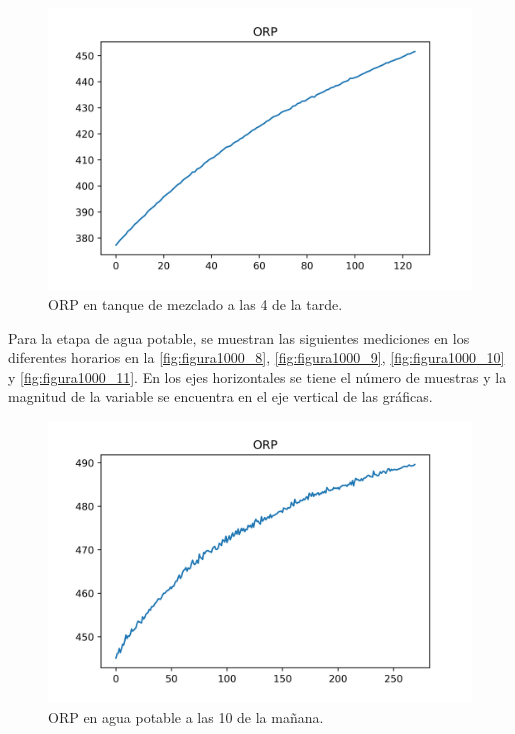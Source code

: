 \begin{figure}[h]
	\centering
	\includegraphics[scale=0.7]{imgss160.png}
	\caption{ORP en tanque de mezclado a las 4 de la tarde.}
	\label{fig:figura1000_7}
\end{figure}

Para la etapa de agua potable, se muestran las siguientes mediciones en los diferentes horarios en la \autoref{fig:figura1000_8}, \autoref{fig:figura1000_9}, \autoref{fig:figura1000_10} y \autoref{fig:figura1000_11}. 
En los ejes horizontales se tiene el número de muestras y la magnitud de la variable se encuentra en el eje vertical de las gráficas.

\clearpage

\begin{figure}[h]
	\centering
	\includegraphics[scale=0.7]{imgss161.png}
	\caption{ORP en agua potable a las 10 de la mañana.}
	\label{fig:figura1000_8}
\end{figure}

